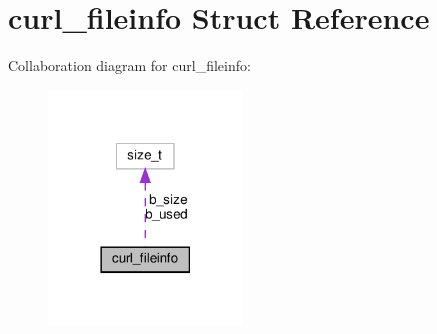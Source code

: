 \hypertarget{structcurl__fileinfo}{}\section{curl\+\_\+fileinfo Struct Reference}
\label{structcurl__fileinfo}


Collaboration diagram for curl\+\_\+fileinfo\+:
\nopagebreak
\begin{figure}[H]
\begin{center}
\leavevmode
\includegraphics[width=146pt]{structcurl__fileinfo__coll__graph}
\end{center}
\end{figure}
